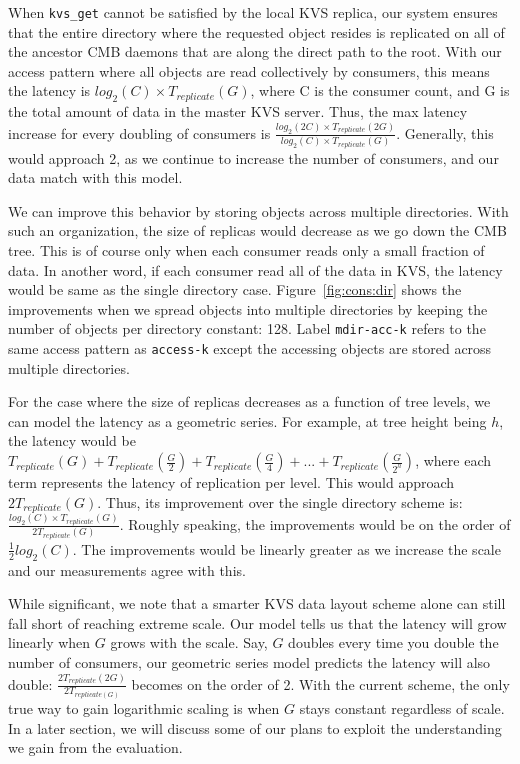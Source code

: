 When {\tt kvs\_get} cannot be satisfied by the local KVS replica,
our system ensures that the entire directory where
the requested object resides is replicated on
all of the ancestor CMB daemons that are along the direct path 
to the root. With our access pattern where all objects
are read collectively by consumers, this means the latency is 
$log_2(C) \times T_{replicate}(G)$, where C is the consumer count, and G is the 
total amount of data in the master KVS server.
Thus, the max latency increase for every doubling of consumers is 
$\frac{log_2(2C) \times T_{replicate}(2G)}{log_2(C) \times T_{replicate}(G)}$.
Generally, this would approach 2, 
as we continue to increase the number of consumers,
and our data match with this model.

We can improve this behavior by storing objects across multiple
directories. With such an organization, the size of replicas 
would decrease as we go down the CMB tree. This is of course only when
each consumer reads only a small fraction of data. In another
word, if each consumer read all of the data in KVS, the latency
would be same as the single directory case. 
Figure~\ref{fig:cons:dir} shows the improvements 
when we spread objects into multiple directories by
keeping the number of objects per directory constant: 128.
Label {\tt mdir-acc-k} refers to the same access pattern as {\tt access-k} 
except the accessing objects are stored across multiple directories.


For the case where the size of replicas 
decreases as a function of tree levels, 
we can model the latency as a geometric series. For example, at tree height being $h$,
the latency would be 
$T_{replicate}(G) + T_{replicate}(\frac{G}{2}) + T_{replicate}(\frac{G}{4}) + ... + T_{replicate}(\frac{G}{2^h})$, 
where each term represents the latency of replication per level.
This would approach $2T_{replicate}(G)$. Thus, its improvement over the single
directory scheme is: $\frac{log_2(C) \times T_{replicate}(G)}{2 T_{replicate}(G)}$.
Roughly speaking, the improvements would be on the order of 
$\frac{1}{2}log_2(C)$. The improvements would be linearly 
greater as we increase the scale and our measurements agree with this. 

While significant, we note that a smarter KVS data layout scheme alone
can still fall short of reaching extreme scale. Our model tells us that the latency
will grow linearly when $G$ grows with the scale. 
Say, $G$ doubles every time you double the number of consumers, our geometric series
model predicts the latency will also double:
$\frac{2T_{replicate}(2G)}{2T_{replicate(G)}}$ becomes 
on the order of 2. With the current scheme, the only true way to gain logarithmic
scaling is when $G$ stays constant regardless of scale. 
In a later section, we will discuss some of our plans 
to exploit the understanding we gain from the evaluation. 


